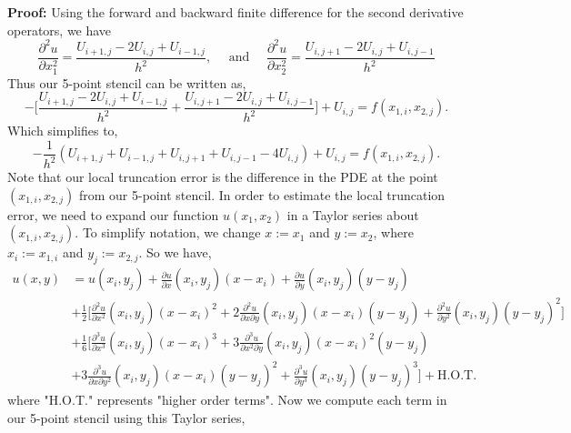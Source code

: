 \documentclass[11pt]{article}
\begin{document}
\textbf{Proof:} Using the forward and backward finite difference for the second derivative operators, we have
\begin{equation*}
    \frac{\partial^2 u}{\partial x_1^2} = \frac{U_{i+1,j} - 2U_{i,j} + U_{i-1,j}}{h^2}, \quad \text{ and } \quad \frac{\partial^2 u}{\partial x_2^2} = \frac{U_{i,j+1} - 2U_{i,j} + U_{i,j-1}}{h^2}
\end{equation*}
Thus our 5-point stencil can be written as,
\begin{equation}
    -\Big[ \frac{U_{i+1,j} - 2U_{i,j} + U_{i-1,j}}{h^2} + \frac{U_{i,j+1} - 2U_{i,j} + U_{i,j-1}}{h^2} \Big] + U_{i,j} = f(x_{1,i}, x_{2,j}).
\end{equation}
Which simplifies to,
\begin{equation}
    -\frac{1}{h^2}( U_{i+1,j} + U_{i-1,j} + U_{i,j+1} + U_{i,j-1} - 4 U_{i,j} ) + U_{i,j} = f(x_{1,i}, x_{2,j}).
\end{equation}
Note that our local truncation error is the difference in the PDE at the point $(x_{1,i}, x_{2,j})$ from our 5-point stencil.
In order to estimate the local truncation error, we need to expand our function $u(x_1, x_2)$ in a Taylor series about $(x_{1,i}, x_{2,j})$.
To simplify notation, we change $x := x_1$ and $y := x_2$, where $x_i := x_{1,i}$ and $y_j := x_{2,j}$.
So we have,
\begin{equation*}
\begin{split}
    u(x, y) &= u(x_i, y_j) + \frac{\partial u}{\partial x}(x_i, y_j)(x - x_i) + \frac{\partial u}{\partial y}(x_i, y_j)(y - y_j) \\
    &+ \frac{1}{2} \Big[ \frac{\partial^2 u}{\partial x^2}(x_i, y_j)(x - x_i)^2 + 2\frac{\partial^2 u}{\partial x \partial y}(x_i, y_j) (x - x_i)(y - y_j) + \frac{\partial^2 u}{\partial y^2}(x_i, y_j)(y - y_j)^2 \Big]  \\
    &+ \frac{1}{6} \Big[ \frac{\partial^3 u}{\partial x^3}(x_i,y_j) (x - x_i)^3 + 3\frac{\partial^3 u}{\partial x^2 \partial y}(x_i, y_j)(x - x_i)^2(y - y_j) \\
    &+ 3\frac{\partial^3 u}{\partial x \partial y^2}(x_i, y_j)(x - x_i)(y - y_j)^2 + \frac{\partial^3 u}{\partial y^3}(x_i, y_j)(y - y_j)^3 \Big] + \text{H.O.T.}
\end{split}
\end{equation*}
where "H.O.T." represents "higher order terms".
Now we compute each term in our 5-point stencil using this Taylor series,
\end{document}

